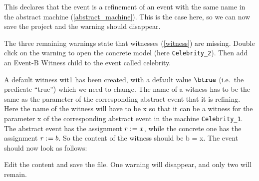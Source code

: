  This declares that the event is a refinement of an event with the same name in the abstract machine (\ref{abstract_machine}). This is the case here, so we can now save the project and the warning should disappear.


The three remaining warnings state that witnesses (\ref{witness}) are missing. Double click on the warning to open the concrete model (here \texttt{Celebrity\_2}). Then add an \textsf{Event-B Witness} child to the event called \textsf{celebrity}.

A default witness \textsf{wit1} has been created, with a default value \textsf{$\btrue$} (i.e.\ the predicate ``true'') which we need to change. The name of a witness has to be the same as the parameter of the corresponding abstract event that it is refining. Here the name of the witness will have to be \textsf{x} so that it can be a witness for the parameter \textsf{x} of the corresponding abstract event in the machine \texttt{Celebrity\_1}. The abstract event has the assignment \textsf{$r \mathrel{:\mkern1mu=} x$}, while the concrete one has the assignment \textsf{$r \mathrel{:\mkern1mu=} b$}. So the content of the witness should be \textsf{b = x}. The event should now look as follows: 


Edit the content and save the file. One warning will disappear, and only two will remain.

